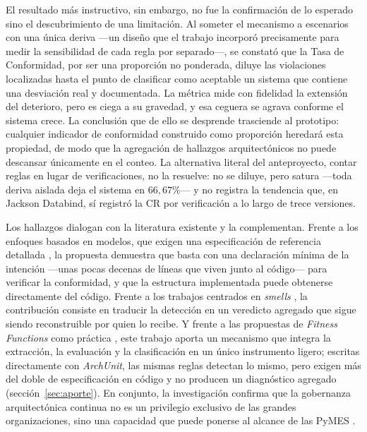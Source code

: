 El resultado más instructivo, sin embargo, no fue la confirmación de lo esperado sino el descubrimiento de una limitación. Al someter el mecanismo a escenarios con una única deriva —un diseño que el trabajo incorporó precisamente para medir la sensibilidad de cada regla por separado—, se constató que la Tasa de Conformidad, por ser una proporción no ponderada, diluye las violaciones localizadas hasta el punto de clasificar como aceptable un sistema que contiene una desviación real y documentada. La métrica mide con fidelidad la extensión del deterioro, pero es ciega a su gravedad, y esa ceguera se agrava conforme el sistema crece. La conclusión que de ello se desprende trasciende al prototipo: cualquier indicador de conformidad construido como proporción heredará esta propiedad, de modo que la agregación de hallazgos arquitectónicos no puede descansar únicamente en el conteo. La alternativa literal del anteproyecto, contar reglas en lugar de verificaciones, no la resuelve: no se diluye, pero satura ---toda deriva aislada deja el sistema en $66{,}67\%$--- y no registra la tendencia que, en Jackson Databind, sí registró la CR por verificación a lo largo de trece versiones.

Los hallazgos dialogan con la literatura existente y la complementan. Frente a los enfoques basados en modelos, que exigen una especificación de referencia detallada \citep{Murphy2001, SanMartin, KnodelPopescu2007}, la propuesta demuestra que basta con una declaración mínima de la intención ---unas pocas decenas de líneas que viven junto al código--- para verificar la conformidad, y que la estructura implementada puede obtenerse directamente del código. Frente a los trabajos centrados en \textit{smells} \citep{Sas2019, SasAvgeriou}, la contribución consiste en traducir la detección en un veredicto agregado que sigue siendo reconstruible por quien lo recibe. Y frente a las propuestas de \textit{Fitness Functions} como práctica \citep{FordParsonsKua2017, Ford2022, PaulWang2019, ArchUnit}, este trabajo aporta un mecanismo que integra la extracción, la evaluación y la clasificación en un único instrumento ligero; escritas directamente con \textit{ArchUnit}, las mismas reglas detectan lo mismo, pero exigen más del doble de especificación en código y no producen un diagnóstico agregado (sección~\ref{sec:aporte}). En conjunto, la investigación confirma que la gobernanza arquitectónica continua no es un privilegio exclusivo de las grandes organizaciones, sino una capacidad que puede ponerse al alcance de las PyMES \citep{LAIG2025}.

